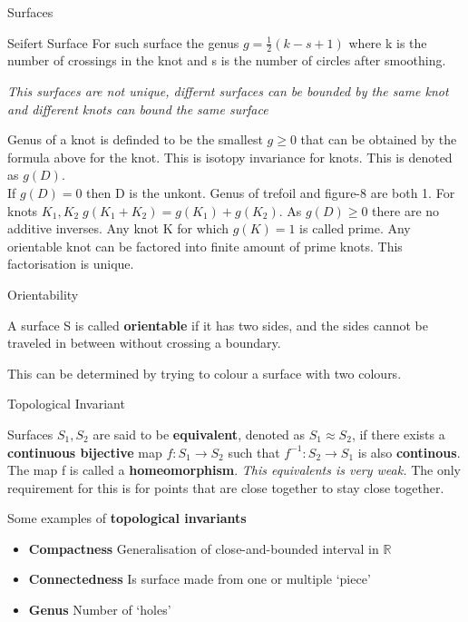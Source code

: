\documentclass[12pt, letterpaper]{article}
\begin{document}
\begin{section}{Surfaces}
\begin{subsection}{Seifert Surface}
    For such surface the genus \(g = \frac{1}{2} (k - s  + 1)\) where k is the
    number of crossings in the knot and s is the number of circles after smoothing.

    \emph{This surfaces are not unique, differnt surfaces can be bounded by the
      same knot and different knots can bound the same surface}

    Genus of a knot is definded to be the smallest \(g \geq 0\) that can be
    obtained by the formula above for the knot. This is isotopy invariance for
    knots. This is denoted as \(g(D)\). \\
    If \(g(D) = 0\) then D is the unkont. Genus of trefoil and figure-8 are both 1.
    For knots \(K_{1}, K_{2} \; g(K_{1} + K_{2}) = g(K_{1}) + g(K_{2})\). As
    \(g(D) \geq 0\) there are no additive inverses. Any knot K for which \(g(K) = 1\)
    is called prime. Any orientable knot can be factored into finite amount of prime
    knots. This factorisation is unique.

  \end{subsection}

  \begin{subsection}{Orientability}

    A surface S is called \textbf{orientable} if it has two sides, and
    the sides cannot be traveled in between without crossing a boundary.

    This can be determined by trying to colour a surface with two colours.

  \end{subsection}

  \begin{subsection}{Topological Invariant}

    Surfaces \(S_{1}, S_{2}\) are said to be \textbf{equivalent}, denoted as
    \(S_{1} \approx S_{2}\), if there exists a \textbf{continuous bijective}
    map \(f: S_{1} \to S_{2}\) such that \(f^{-1}: S_{2} \to S_{1}\) is also
    \textbf{continous}. The map f is called a \textbf{homeomorphism}.
    \emph{This equivalents is very weak.} The only requirement for this is
    for points that are close together to stay close together.

    Some examples of \textbf{topological invariants}
    \begin{itemize}
      \item \textbf{Compactness}
            Generalisation of close-and-bounded interval in \(\mathbb{R}\)
      \item \textbf{Connectedness}
            Is surface made from one or multiple `piece'
      \item \textbf{Genus}
            Number of `holes'
    \end{itemize}


\end{subsection}
\end{section}
\end{document}
